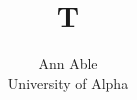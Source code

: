 \documentclass{article}
\begin{document}
\title{T}
\author{Ann Able \\ University of Alpha}
\maketitle
\end{document}
